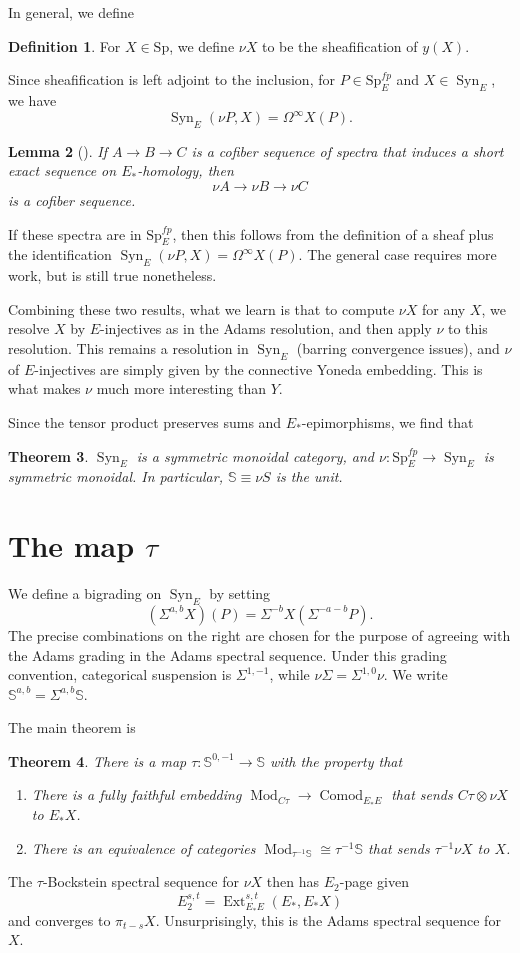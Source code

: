 \documentclass{shortart}
\newtheorem{thm}{Theorem}[section]
\newtheorem{lemma}[thm]{Lemma}
\theoremstyle{definition}
\newtheorem{defi}[thm]{Definition}
\renewcommand\S{{\mathbb{S}}}
\newcommand\Sp{{\mathrm{Sp}}}
\DeclareMathOperator\Ext{Ext}
\DeclareMathOperator\Syn{Syn}
\DeclareMathOperator\Mod{Mod}
\begin{document}
In general, we define
\begin{defi}
  For $X \in \Sp$, we define $\nu X$ to be the sheafification of $y(X)$.
\end{defi}

Since sheafification is left adjoint to the inclusion, for $P \in \Sp_E^{fp}$ and $X \in \Syn_E$, we have
\[
  \Syn_E(\nu P, X) = \Omega^\infty X(P).
\]

\begin{lemma}[{\cite[Lemma 4.23]{synthetic}}]
  If $A \to B \to C$ is a cofiber sequence of spectra that induces a short exact sequence on $E_*$-homology, then
  \[
    \nu A \to \nu B \to \nu C
  \]
  is a cofiber sequence.
\end{lemma}
If these spectra are in $\Sp_E^{fp}$, then this follows from the definition of a sheaf plus the identification $\Syn_E(\nu P, X) = \Omega^\infty X(P)$. The general case requires more work, but is still true nonetheless.

Combining these two results, what we learn is that to compute $\nu X$ for any $X$, we resolve $X$ by $E$-injectives as in the Adams resolution, and then apply $\nu$ to this resolution. This remains a resolution in $\Syn_E$ (barring convergence issues), and $\nu$ of $E$-injectives are simply given by the connective Yoneda embedding. This is what makes $\nu$ much more interesting than $Y$.

Since the tensor product preserves sums and $E_*$-epimorphisms, we find that
\begin{thm}
  $\Syn_E$ is a symmetric monoidal category, and $\nu\colon \Sp_E^{fp} \to \Syn_E$ is symmetric monoidal. In particular, $\S \equiv \nu S$ is the unit.
\end{thm}

\section{The map \texorpdfstring{$\tau$}{tau}}
We define a bigrading on $\Syn_E$ by setting
\[
  (\Sigma^{a, b} X)(P) = \Sigma^{-b} X(\Sigma^{-a - b} P).
\]
The precise combinations on the right are chosen for the purpose of agreeing with the Adams grading in the Adams spectral sequence. Under this grading convention, categorical suspension is $\Sigma^{1, -1}$, while $\nu \Sigma = \Sigma^{1, 0} \nu$. We write $\S^{a, b} = \Sigma^{a, b} \S$.

The main theorem is
\begin{thm}
  There is a map $\tau \colon \S^{0, -1} \to \S$ with the property that
  \begin{enumerate}
    \item There is a fully faithful embedding $\Mod_{C\tau} \to \operatorname{Comod}_{E_*E}$ that sends $C\tau \otimes \nu X$ to $E_* X$.
    \item There is an equivalence of categories $\Mod_{\tau^{-1} \S} \cong \tau^{-1} \S$ that sends $\tau^{-1} \nu X$ to $X$.
  \end{enumerate}
\end{thm}
The $\tau$-Bockstein spectral sequence for $\nu X$ then has $E_2$-page given
\[
  E^{s, t}_2 = \Ext_{E_*E}^{s, t}(E_*, E_*X)
\]
and converges to $\pi_{t - s} X$. Unsurprisingly, this is the Adams spectral sequence for $X$.
\end{document}
